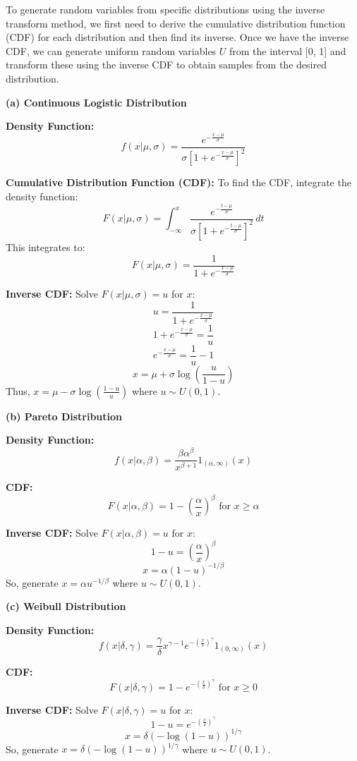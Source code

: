 \documentclass[8pt]{article}
\begin{document}
To generate random variables from specific distributions using the inverse transform method, we first need to derive the cumulative distribution function (CDF) for each distribution and then find its inverse. Once we have the inverse CDF, we can generate uniform random variables \( U \) from the interval [0, 1] and transform these using the inverse CDF to obtain samples from the desired distribution.

\textbf{(a) Continuous Logistic Distribution}

\textbf{Density Function:}
\[
f(x|\mu, \sigma) = \frac{e^{-\frac{x-\mu}{\sigma}}}{\sigma [1 + e^{-\frac{x-\mu}{\sigma}}]^2}
\]

\textbf{Cumulative Distribution Function (CDF):}
To find the CDF, integrate the density function:
\[
F(x|\mu, \sigma) = \int_{-\infty}^x \frac{e^{-\frac{t-\mu}{\sigma}}}{\sigma [1 + e^{-\frac{t-\mu}{\sigma}}]^2} \, dt
\]
This integrates to:
\[
F(x|\mu, \sigma) = \frac{1}{1 + e^{-\frac{x-\mu}{\sigma}}}
\]

\textbf{Inverse CDF:}
Solve \( F(x|\mu, \sigma) = u \) for \( x \):
\[
u = \frac{1}{1 + e^{-\frac{x-\mu}{\sigma}}}
\]
\[
1 + e^{-\frac{x-\mu}{\sigma}} = \frac{1}{u}
\]
\[
e^{-\frac{x-\mu}{\sigma}} = \frac{1}{u} - 1
\]
\[
x = \mu + \sigma \log\left(\frac{u}{1-u}\right)
\]
Thus, \( x = \mu - \sigma \log\left(\frac{1-u}{u}\right) \) where \( u \sim U(0, 1) \).

\textbf{(b) Pareto Distribution}

\textbf{Density Function:}
\[
f(x|\alpha, \beta) = \frac{\beta \alpha^\beta}{x^{\beta+1}} 1_{(\alpha, \infty)}(x)
\]

\textbf{CDF:}
\[
F(x|\alpha, \beta) = 1 - \left(\frac{\alpha}{x}\right)^\beta \text{ for } x \geq \alpha
\]

\textbf{Inverse CDF:}
Solve \( F(x|\alpha, \beta) = u \) for \( x \):
\[
1 - u = \left(\frac{\alpha}{x}\right)^\beta
\]
\[
x = \alpha (1 - u)^{-1/\beta}
\]
So, generate \( x = \alpha u^{-1/\beta} \) where \( u \sim U(0, 1) \).

\textbf{(c) Weibull Distribution}

\textbf{Density Function:}
\[
f(x|\delta, \gamma) = \frac{\gamma}{\delta} x^{\gamma-1} e^{-\left(\frac{x}{\delta}\right)^\gamma} 1_{(0, \infty)}(x)
\]

\textbf{CDF:}
\[
F(x|\delta, \gamma) = 1 - e^{-\left(\frac{x}{\delta}\right)^\gamma} \text{ for } x \geq 0
\]

\textbf{Inverse CDF:}
Solve \( F(x|\delta, \gamma) = u \) for \( x \):
\[
1 - u = e^{-\left(\frac{x}{\delta}\right)^\gamma}
\]
\[
x = \delta \left(-\log(1-u)\right)^{1/\gamma}
\]
So, generate \( x = \delta (-\log(1-u))^{1/\gamma} \) where \( u \sim U(0, 1) \).
\end{document}
